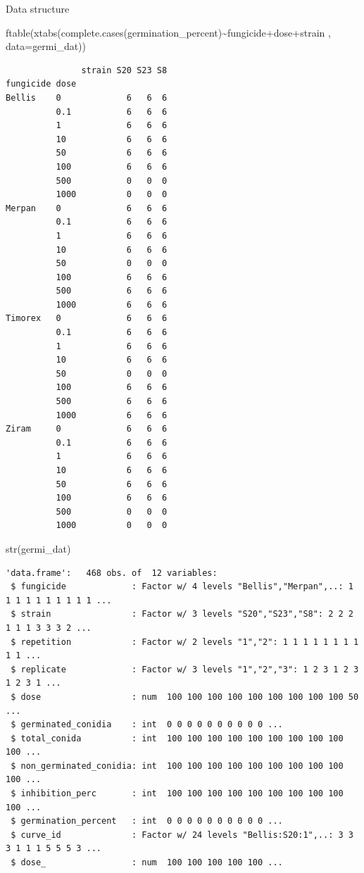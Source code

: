 \documentclass[
  letterpaper,
  DIV=11,
  numbers=noendperiod]{scrreport}
\newenvironment{Shaded}{\begin{snugshade}}{\end{snugshade}}
\newcommand{\AttributeTok}[1]{\textcolor[rgb]{0.40,0.45,0.13}{#1}}
\newcommand{\FunctionTok}[1]{\textcolor[rgb]{0.28,0.35,0.67}{#1}}
\newcommand{\NormalTok}[1]{\textcolor[rgb]{0.00,0.23,0.31}{#1}}
\newcommand{\SpecialCharTok}[1]{\textcolor[rgb]{0.37,0.37,0.37}{#1}}
\begin{document}
Data structure

\begin{Shaded}
\begin{Highlighting}[]
\FunctionTok{ftable}\NormalTok{(}\FunctionTok{xtabs}\NormalTok{(}\FunctionTok{complete.cases}\NormalTok{(germination\_percent)}\SpecialCharTok{\textasciitilde{}}\NormalTok{fungicide}\SpecialCharTok{+}\NormalTok{dose}\SpecialCharTok{+}\NormalTok{strain , }\AttributeTok{data=}\NormalTok{germi\_dat))}
\end{Highlighting}
\end{Shaded}

\begin{verbatim}
               strain S20 S23 S8
fungicide dose                  
Bellis    0             6   6  6
          0.1           6   6  6
          1             6   6  6
          10            6   6  6
          50            6   6  6
          100           6   6  6
          500           0   0  0
          1000          0   0  0
Merpan    0             6   6  6
          0.1           6   6  6
          1             6   6  6
          10            6   6  6
          50            0   0  0
          100           6   6  6
          500           6   6  6
          1000          6   6  6
Timorex   0             6   6  6
          0.1           6   6  6
          1             6   6  6
          10            6   6  6
          50            0   0  0
          100           6   6  6
          500           6   6  6
          1000          6   6  6
Ziram     0             6   6  6
          0.1           6   6  6
          1             6   6  6
          10            6   6  6
          50            6   6  6
          100           6   6  6
          500           0   0  0
          1000          0   0  0
\end{verbatim}

\begin{Shaded}
\begin{Highlighting}[]
\FunctionTok{str}\NormalTok{(germi\_dat)}
\end{Highlighting}
\end{Shaded}

\begin{verbatim}
'data.frame':   468 obs. of  12 variables:
 $ fungicide             : Factor w/ 4 levels "Bellis","Merpan",..: 1 1 1 1 1 1 1 1 1 1 ...
 $ strain                : Factor w/ 3 levels "S20","S23","S8": 2 2 2 1 1 1 3 3 3 2 ...
 $ repetition            : Factor w/ 2 levels "1","2": 1 1 1 1 1 1 1 1 1 1 ...
 $ replicate             : Factor w/ 3 levels "1","2","3": 1 2 3 1 2 3 1 2 3 1 ...
 $ dose                  : num  100 100 100 100 100 100 100 100 100 50 ...
 $ germinated_conidia    : int  0 0 0 0 0 0 0 0 0 0 ...
 $ total_conida          : int  100 100 100 100 100 100 100 100 100 100 ...
 $ non_germinated_conidia: int  100 100 100 100 100 100 100 100 100 100 ...
 $ inhibition_perc       : int  100 100 100 100 100 100 100 100 100 100 ...
 $ germination_percent   : int  0 0 0 0 0 0 0 0 0 0 ...
 $ curve_id              : Factor w/ 24 levels "Bellis:S20:1",..: 3 3 3 1 1 1 5 5 5 3 ...
 $ dose_                 : num  100 100 100 100 100 ...
\end{verbatim}
\end{document}
